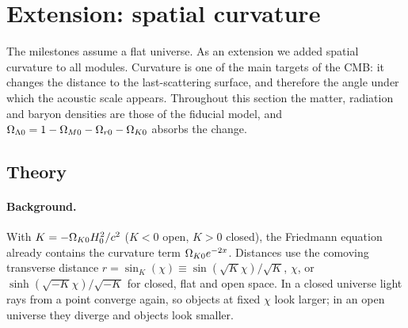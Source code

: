 \section{Extension: spatial curvature}\label{sec:curvature}

The milestones assume a flat universe. As an extension we added spatial curvature to all modules. Curvature is
one of the main targets of the CMB: it changes the distance to the last-scattering surface, and therefore the angle
under which the acoustic scale appears. Throughout this section the matter, radiation and baryon densities are those
of the fiducial model, and $\Omega_{\Lambda0}=1-\Omega_{M0}-\Omega_{r0}-\Omega_{K0}$ absorbs the change.

\subsection{Theory}

\paragraph*{Background.} With $K=-\Omega_{K0}H_0^2/c^2$ ($K<0$ open, $K>0$ closed), the Friedmann equation already
contains the curvature term $\Omega_{K0}e^{-2x}$. Distances use the comoving transverse distance
$r=\sin_K(\chi)\equiv\sin(\sqrt K\chi)/\sqrt K$, $\chi$, or $\sinh(\sqrt{-K}\chi)/\sqrt{-K}$ for closed, flat and open
space. In a closed universe light rays from a point converge again, so objects at fixed $\chi$ look larger; in an open
universe they diverge and objects look smaller.

